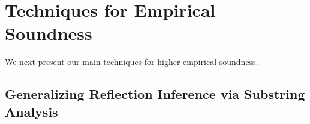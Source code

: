
%
%
%
%



\section{Techniques for Empirical Soundness}
\label{reflection/soundiness}

We next present our main techniques for higher empirical soundness.


\subsection{Generalizing Reflection Inference via Substring Analysis}  
\label{reflection/sec:strings}

